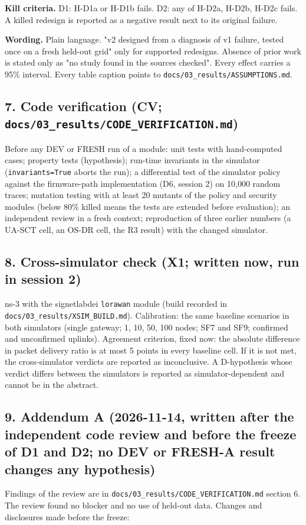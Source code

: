 \textbf{Kill criteria.} D1: H-D1a or H-D1b fails. D2: any of H-D2a, H-D2b, H-D2c fails. A killed redesign is reported as a negative result next to its original failure.

\textbf{Wording.} Plain language. "v2 designed from a diagnosis of v1 failure, tested once on a fresh held-out grid" only for supported redesigns. Absence of prior work is stated only as "no study found in the sources checked". Every effect carries a 95\% interval. Every table caption points to \texttt{docs/03\_results/ASSUMPTIONS.md}.

\subsection*{7. Code verification (CV; \texttt{docs/03\_results/CODE\_VERIFICATION.md})}
Before any DEV or FRESH run of a module: unit tests with hand-computed cases; property tests (hypothesis); run-time invariants in the simulator (\texttt{invariants=True} aborts the run); a differential test of the simulator policy against the firmware-path implementation (D6, session 2) on 10,000 random traces; mutation testing with at least 20 mutants of the policy and security modules (below 80\% killed means the tests are extended before evaluation); an independent review in a fresh context; reproduction of three earlier numbers (a UA-SCT cell, an OS-DR cell, the R3 result) with the changed simulator.

\subsection*{8. Cross-simulator check (X1; written now, run in session 2)}
ns-3 with the signetlabdei \texttt{lorawan} module (build recorded in \texttt{docs/03\_results/XSIM\_BUILD.md}). Calibration: the same baseline scenarios in both simulators (single gateway; 1, 10, 50, 100 nodes; SF7 and SF9; confirmed and unconfirmed uplinks). Agreement criterion, fixed now: the absolute difference in packet delivery ratio is at most 5 points in every baseline cell. If it is not met, the cross-simulator verdicts are reported as inconclusive. A D-hypothesis whose verdict differs between the simulators is reported as simulator-dependent and cannot be in the abstract.

\subsection*{9. Addendum A (2026-11-14, written after the independent code review and before the freeze of D1 and D2; no DEV or FRESH-A result changes any hypothesis)}
Findings of the review are in \texttt{docs/03\_results/CODE\_VERIFICATION.md} section 6. The review found no blocker and no use of held-out data. Changes and disclosures made before the freeze:


